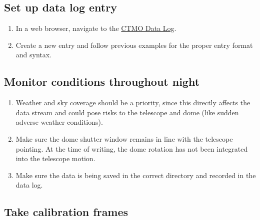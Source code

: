\documentclass{article}
\begin{document}
	\subsection{Set up data log entry}
	
	\begin{enumerate}
		
		\item In a web browser, navigate to the \href{https://docs.google.com/spreadsheets/d/1-flrFYcHwpuXavXAMwkF41ibTWqWWC0Sgsv5X402HyY/edit?usp=sharing}{CTMO Data Log}.
		
		\item Create a new entry and follow previous examples for the proper entry format and syntax.
		
	\end{enumerate}
	
	\subsection{Monitor conditions throughout night}
	
	\begin{enumerate}
		
		\item Weather and sky coverage should be a priority, since this directly affects the data stream and could pose risks to the telescope and dome (like sudden adverse weather conditions).
		
		\item Make sure the dome shutter window remains in line with the telescope pointing. At the time of writing, the dome rotation has not been integrated into the telescope motion.
		
		\item Make sure the data is being saved in the correct directory and recorded in the data log.
		
	\end{enumerate}
	
	\subsection{Take calibration frames}
	
\end{document}
